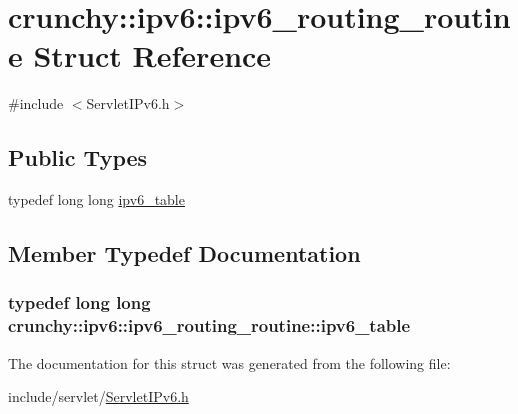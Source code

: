 \hypertarget{structcrunchy_1_1ipv6_1_1ipv6__routing__routine}{}\section{crunchy\+:\+:ipv6\+:\+:ipv6\+\_\+routing\+\_\+routine Struct Reference}
\label{structcrunchy_1_1ipv6_1_1ipv6__routing__routine}


{\ttfamily \#include $<$Servlet\+I\+Pv6.\+h$>$}

\subsection*{Public Types}
\begin{DoxyCompactItemize}
\item 
typedef long long \hyperlink{structcrunchy_1_1ipv6_1_1ipv6__routing__routine_a0d03ccdeb79ac0e9e7fc09c4938b7838}{ipv6\+\_\+table}
\end{DoxyCompactItemize}


\subsection{Member Typedef Documentation}
\hypertarget{structcrunchy_1_1ipv6_1_1ipv6__routing__routine_a0d03ccdeb79ac0e9e7fc09c4938b7838}{}
\subsubsection[{ipv6\+\_\+table}]{\setlength{\rightskip}{0pt plus 5cm}typedef long long {\bf crunchy\+::ipv6\+::ipv6\+\_\+routing\+\_\+routine\+::ipv6\+\_\+table}}\label{structcrunchy_1_1ipv6_1_1ipv6__routing__routine_a0d03ccdeb79ac0e9e7fc09c4938b7838}


The documentation for this struct was generated from the following file\+:\begin{DoxyCompactItemize}
\item 
include/servlet/\hyperlink{_servlet_i_pv6_8h}{Servlet\+I\+Pv6.\+h}\end{DoxyCompactItemize}
